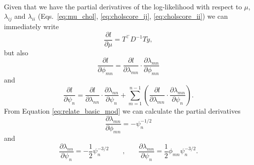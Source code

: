 \documentclass{article}
\begin{document}
\hfill \\
Given that we have the partial derivatives of the log-likelihood with respect to 
$\mu$, $\lambda_{ij}$ and $\lambda_{ii}$ (Eqs.\ \ref{eq:mu_chol}, 
\ref{eq:cholscore_ij}, \ref{eq:cholscore_ii}) we can immediately write 
%
\begin{equation}
	\frac{\partial l}{\partial \mu} = T^\top D^{-1} T \tilde{y},
 \label{eq:mu_modchol}
\end{equation}
%
but also
%
\begin{equation}
	\frac{\partial l}{\partial \phi_{mn}} = \frac{\partial l}{\partial \lambda_{mn}} 
	\cdot \frac{\partial \lambda_{mn}}{\partial \phi_{mn}}
\end{equation}
%
and
%
\begin{equation}
	\frac{\partial l}{\partial \psi_{n}} = \frac{\partial l}{\partial \lambda_{nn}} 
	\cdot \frac{\partial \lambda_{nn}}{\partial \psi_{n}} + 
	\sum_{m=1}^{n-1} \left(  \frac{\partial l}{\partial \lambda_{mn}} 
	\cdot \frac{\partial \lambda_{mn}}{\partial \psi_{n}} \right).
\end{equation}
%
From Equation \ref{eq:relate_basic_mod} we can calculate the partial derivatives 
%
\begin{equation}
	\frac{\partial \lambda_{mn}}{\partial \phi_{mn}} = - \psi_n^{-1/2} 
\end{equation}
%
and
%
\begin{equation}
	\frac{\partial \lambda_{nn}}{\partial \psi_{n}} = -\frac{1}{2} \psi_n^{-3/2}
	\qquad \text{,} \qquad
	\frac{\partial \lambda_{mn}}{\partial \psi_{n}} = \frac{1}{2} \phi_{mn} \psi_n^{-3/2}.	
\end{equation}
%
\end{document}
